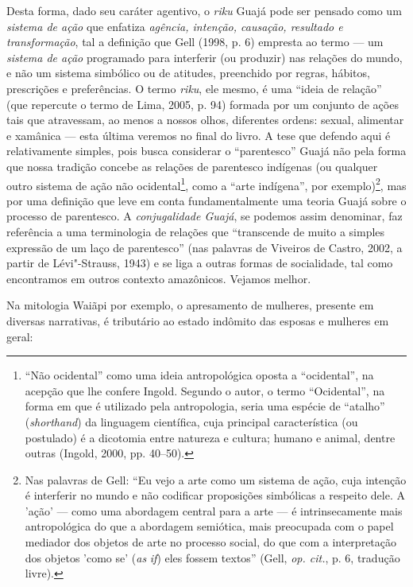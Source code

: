 Desta forma, dado seu caráter agentivo, o \emph{riku} Guajá pode ser
pensado como um \emph{sistema de ação} que enfatiza \emph{agência,
intenção, causação, resultado e transformação}, tal a definição que Gell
(1998, p. 6) empresta ao termo --- um \emph{sistema de ação} programado
para interferir (ou produzir) nas relações do mundo, e não um sistema
simbólico ou de atitudes, preenchido por regras, hábitos, prescrições e
preferências. O termo \emph{riku}, ele mesmo, é uma ``ideia de relação''
(que repercute o termo de Lima, 2005, p. 94) formada por um conjunto de
ações tais que atravessam, ao menos a nossos olhos, diferentes ordens:
sexual, alimentar e xamânica --- esta última veremos no final do livro. A
tese que defendo aqui é relativamente simples, pois busca considerar o
``parentesco'' Guajá não pela forma que nossa tradição concebe as relações
de parentesco indígenas (ou qualquer outro sistema de ação não
ocidental\footnote{``Não ocidental'' como uma ideia antropológica oposta a
  ``ocidental'', na acepção que lhe confere Ingold. Segundo o autor, o
  termo ``Ocidental'', na forma em que é utilizado pela antropologia,
  seria uma espécie de ``atalho'' (\emph{shorthand}) da linguagem
  científica, cuja principal característica (ou postulado) é a dicotomia
  entre natureza e cultura; humano e animal, dentre outras (Ingold,
  2000, pp. 40--50).}, como a ``arte indígena'', por exemplo)\footnote{Nas
  palavras de Gell: ``Eu vejo a arte como um sistema de ação, cuja
      intenção é interferir no mundo e não codificar proposições simbólicas
      a respeito dele. A 'ação' --- como uma abordagem central para a arte --- é
      intrinsecamente mais antropológica do que a abordagem semiótica, mais
      preocupada com o papel mediador dos objetos de arte no processo
      social, do que com a interpretação dos objetos 'como se' (\emph{as}
      \emph{if}) eles fossem textos'' (Gell, \emph{op. cit.}, p. 6, tradução livre).},
mas por uma definição que leve em conta fundamentalmente uma teoria
Guajá sobre o processo de parentesco. A \emph{conjugalidade Guajá}, se
podemos assim denominar, faz referência a uma terminologia de relações
que ``transcende de muito a simples expressão de um laço de parentesco''
(nas palavras de Viveiros de Castro, 2002, a partir de Lévi"-Strauss,
1943) e se liga a outras formas de socialidade, tal como encontramos em
outros contexto amazônicos. Vejamos melhor.

Na mitologia Waiãpi por exemplo, o apresamento de mulheres, presente em
diversas narrativas, é tributário ao estado indômito das esposas e
mulheres em geral:

